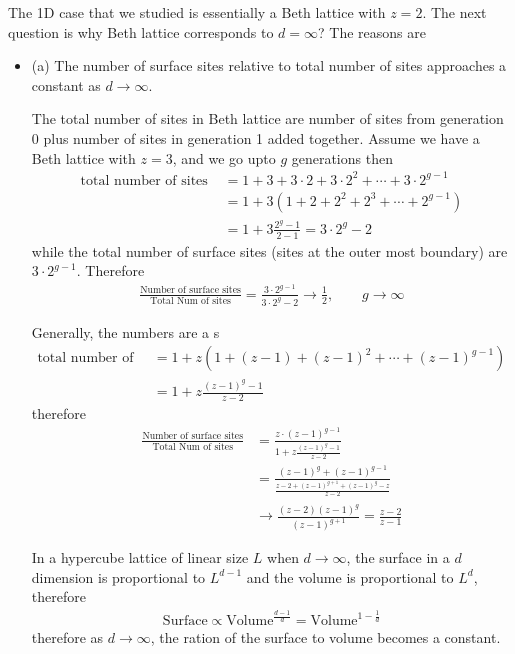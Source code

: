 The 1D case that we studied is essentially a Beth lattice with
$z=2$. The next question is why Beth lattice corresponds to $d=
\infty$? The reasons are

\begin{itemize}
\item (a) The number of surface sites relative to total number of
  sites approaches a constant as $d\to \infty$.

  The total number of sites in Beth lattice are number of sites from
  generation 0 plus number of sites in generation 1 added
  together. Assume we have a Beth lattice with $z=3$, and we go upto
  $g$ generations then
%
\begin{align}
  \text{total number of sites } & = 1 + 3 + 3\cdot 2 + 3 \cdot 2^2 + \cdots + 3 \cdot 2^{g-1} \\
                                & = 1 + 3(1 + 2 + 2^2 + 2^3 + \cdots + 2^{g-1}) \\
  & = 1 + 3 \frac{2^{g}-1 }{2-1}  = 3\cdot 2^g -2 
\end{align}
%
while the total number of surface sites (sites at the outer most
boundary) are $3\cdot 2^{g-1}$. Therefore
%
\begin{align}
  \frac{\text{Number of surface sites}}{\text{Total Num of sites}} = \frac{3\cdot 2^{g-1}}{3 \cdot 2^{g} - 2} \to \frac{1}{2}, \qquad g\to \infty  
\end{align}

Generally, the numbers are a s
%
\begin{align}
  \text{total number of sites} & = 1 + z (1 + (z-1) + (z-1)^{2} + \cdots + (z-1)^{g-1}) \\
  & = 1  + z \frac{(z-1)^{g} - 1 }{z - 2} 
\end{align}
%
therefore
%
\begin{align}
  \frac{\text{Number of surface sites}}{\text{Total Num of sites}} &= \frac{ z \cdot (z-1)^{g-1}}{1  + z \frac{(z-1)^{g} - 1 }{z - 2} } \\
                                                                   & =  \frac{(z-1)^g + (z-1)^{g-1}}{ \frac{z-2 + (z-1)^{g+1} + (z-1)^g - z }{z-2}  }  \\
                                                                   & \to  \frac{(z-2)(z-1)^g}{(z-1)^{g+1}} = \frac{z-2}{z-1} 
\end{align}


In a hypercube lattice of linear size $L$ when $d\to \infty$, the
surface in a $d$ dimension is proportional to $L^{d-1}$ and the volume
is proportional to $L^d$, therefore
%
\begin{align}
  \text{Surface} \propto \text{Volume}^{\frac{d-1}{d}}  = \text{Volume}^{1 - \frac{1}{d}}
\end{align}
%
therefore as $d\to \infty$, the ration of the surface to volume
becomes a constant. 




\end{itemize}
